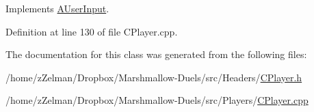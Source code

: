 Implements \hyperlink{classAUserInput_a570f71dde4825c3e9bdcf6b58857f514}{A\-User\-Input}.



Definition at line 130 of file C\-Player.\-cpp.



The documentation for this class was generated from the following files\-:\begin{DoxyCompactItemize}
\item 
/home/z\-Zelman/\-Dropbox/\-Marshmallow-\/\-Duels/src/\-Headers/\hyperlink{CPlayer_8h}{C\-Player.\-h}\item 
/home/z\-Zelman/\-Dropbox/\-Marshmallow-\/\-Duels/src/\-Players/\hyperlink{CPlayer_8cpp}{C\-Player.\-cpp}\end{DoxyCompactItemize}
